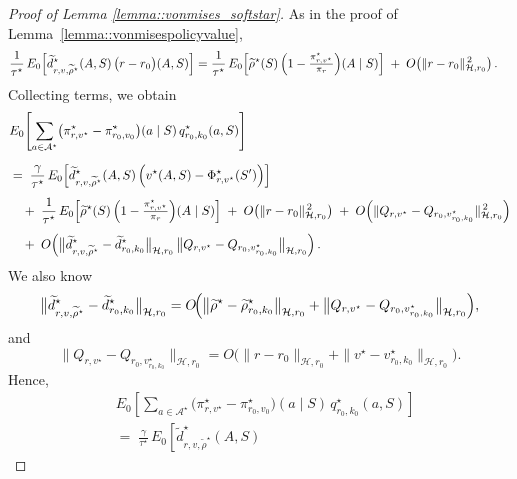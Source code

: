 \documentclass[11pt]{article}
\theoremstyle{plain}
\begin{document}
\begin{proof}[Proof of Lemma \ref{lemma::vonmises_softstar}]
As in the proof of Lemma~\ref{lemma::vonmisespolicyvalue},
\begin{align*}
\frac{1}{\tau^\star}\,
E_0 \!\left[
        \widetilde{d}_{r,v,\widetilde{\rho}^\star}^\star(A,S)\,
        \bigl(r - r_0\bigr)(A,S)
\right]
&=
\frac{1}{\tau^\star}\,
E_0 \!\left[
        \widetilde{\rho}^\star(S)\,
        \Bigl(1 - \tfrac{\pi_{r,v^\star}^\star}{\pi_r}\Bigr)(A \mid S)
\right]
\;+\;
O\!\left(\|r - r_0\|_{\mathcal{H},r_0}^{\,2}\right).
\end{align*}
Collecting terms, we obtain
\begin{align*}
	&E_0\!\left[
	        \sum_{a \in \mathcal{A}^\star}
	        \bigl(\pi_{r,v^\star}^\star - \pi_{r_0,v_0}^\star\bigr)(a \mid S)\,
	        q_{r_0,k_0}^\star(a,S)
	\right]
	\\[6pt]
	&=\;
	\frac{\gamma}{\tau^\star}\,
	E_0\!\left[
	       \widetilde{d}_{r,v,\widetilde{\rho}^\star}^\star(A,S)\,
	       \Bigl(v^\star(A,S) - \Phi_{r,v^\star}^\star(S')\Bigr)
	\right]
\\[4pt]
&\quad +\;
\frac{1}{\tau^\star}\,
E_0\!\left[
        \widetilde{\rho}^\star(S)\,
        \Bigl(1 - \tfrac{\pi_{r,v^\star}^\star}{\pi_r}\Bigr)(A \mid S)
\right]
\;+\;
O\!\left(\|r - r_0\|_{\mathcal{H},r_0}^{\,2}\right)
\;+\;
O\!\left(\|Q_{r,v^\star} - Q_{r_0,v_{r_0,k_0}^\star}\|_{\mathcal{H},r_0}^{\,2}\right)
\\[4pt]
&\quad +\;
O\!\left(
        \bigl\|\widetilde{d}_{r,v,\widetilde{\rho}^\star}^\star - \widetilde{d}_{r_0,k_0}^\star\bigr\|_{\mathcal{H},r_0}\,
        \bigl\|Q_{r,v^\star} - Q_{r_0,v_{r_0,k_0}^\star}\bigr\|_{\mathcal{H},r_0}
    \right).
\end{align*}
We also know
\[
\bigl\|\widetilde{d}_{r,v,\widetilde{\rho}^\star}^\star - \widetilde{d}_{r_0,k_0}^\star\bigr\|_{\mathcal{H},r_0}
= 
O\!\Bigl(
    \bigl\|\widetilde{\rho}^\star - \widetilde{\rho}_{r_0,k_0}^\star\bigr\|_{\mathcal{H},r_0}
    +  
    \bigl\|Q_{r,v^\star} - Q_{r_0,v_{r_0,k_0}^\star}\bigr\|_{\mathcal{H},r_0}
\Bigr),
\]
and
\[
\bigl\|Q_{r,v^\star} - Q_{r_0,v_{r_0,k_0}^\star}\bigr\|_{\mathcal{H},r_0}
=
O\!\bigl(\|r - r_0\|_{\mathcal{H},r_0} + \|v^\star - v_{r_0,k_0}^\star\|_{\mathcal{H},r_0}\bigr).
\]
Hence,
\begin{align*}
	&E_0\!\left[
	        \sum_{a \in \mathcal{A}^\star}
	        \bigl(\pi_{r,v^\star}^\star - \pi_{r_0,v_0}^\star\bigr)(a \mid S)\,
	        q_{r_0,k_0}^\star(a,S)
	\right]
	\\[6pt]
	&=\;
	\frac{\gamma}{\tau^\star}\,
	E_0\!\left[
	       \widetilde{d}_{r,v,\widetilde{\rho}^\star}^\star(A,S)\,

\end{align*}
\end{proof}
\end{document}
